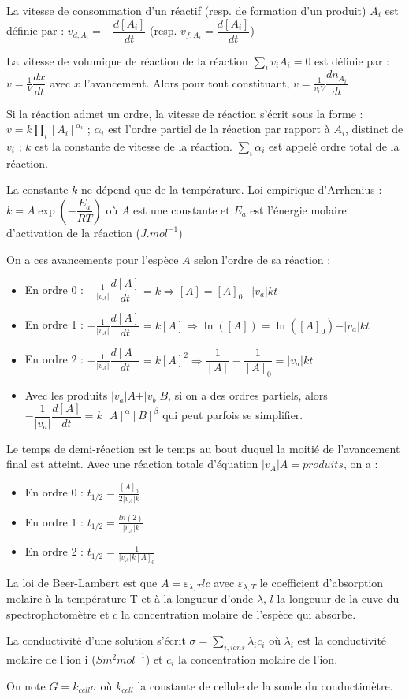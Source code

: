 \documentclass[a4paper,12pt]{book}
\newcommand{\Def}[2]{\begin{tcolorbox}[colback=white,colframe=red!10!green!20!blue!75!, title=Définition : #1]#2\end{tcolorbox}}
\newcommand{\Thr}[2]{\begin{tcolorbox}[sharp corners, colback=white,colframe=red!10!blue!30!green!75!, title=Théorème : #1]#2\end{tcolorbox}}
\newcommand{\Meth}[2]{\begin{tcolorbox}[colback=white,colframe=green!60!green!30!black!75, title=Méthode :  #1]#2\end{tcolorbox}}
\begin{document}
\Def{Vitesses dans une réaction}{La vitesse de consommation d'un réactif (resp. de formation d'un produit) $A_i$ est définie par : $v_{d,A_i} = -\dfrac{d[A_i]}{dt}$ (resp. $v_{f,A_i} = \dfrac{d[A_i]}{dt}$)
\par La vitesse de volumique de réaction de la réaction $\sum\limits_{i} v_iA_i=0$ est définie par : $v=\frac{1}{V}\dfrac{dx}{dt}$ avec $x$ l'avancement. Alors pour tout constituant, $v= \frac{1}{v_i V}\dfrac{dn_{A_i}}{dt}$
\par Si la réaction admet un ordre, la vitesse de réaction s'écrit sous la forme : $v=k\prod\limits_{i}[A_i]^{\alpha_i}$ ; $\alpha_i$ est l'ordre partiel de la réaction par rapport à $A_i$, distinct de $v_i$ ; $k$ est la constante de vitesse de la réaction. $\sum\limits_{i} \alpha_i$ est appelé ordre total de la réaction.
\par La constante $k$ ne dépend que de la température. Loi empirique d'Arrhenius : $k = A\exp(-\dfrac{E_a}{RT})$ où $A$ est une constante et $E_a$ est l'énergie molaire d'activation de la réaction ($J.mol^{-1}$)
}
\Meth{Calculs d'ordre}{On a ces avancements pour l'espèce $A$ selon l'ordre de sa réaction :\begin{itemize}
\item En ordre 0 : $-\frac{1}{\vert v_A\vert}\dfrac{d[A]}{dt}=k\Rightarrow [A]=[A]_0-\vert v_a\vert kt$
\item En ordre 1 : $-\frac{1}{\vert v_A\vert}\dfrac{d[A]}{dt}=k[A]\Rightarrow \ln([A])=\ln([A]_0)-\vert v_a\vert kt$
\item En ordre 2 : $-\frac{1}{\vert v_A\vert}\dfrac{d[A]}{dt}=k[A]^2\Rightarrow \dfrac{1}{[A]}-\dfrac{1}{[A]_0}=\vert v_a\vert kt$
\item Avec les produits $\vert v_a\vert A + \vert v_b\vert B$, si on a des ordres partiels, alors $-\dfrac{1}{\vert v_a\vert}\dfrac{d[A]}{dt}=k[A]^\alpha[B]^\beta$ qui peut parfois se simplifier.
\end{itemize}
}
\Meth{Temps de demi-réaction}{Le temps de demi-réaction est le temps au bout duquel la moitié de l'avancement final est atteint. Avec une réaction totale d'équation $\vert v_A\vert A = produits$, on a :\begin{itemize}
\item En ordre 0 : $t_{1/2} = \frac{[A]_0}{2\vert v_A\vert k}$ 
\item En ordre 1 : $t_{1/2} = \frac{ln(2)}{\vert v_A\vert k}$
\item En ordre 2 : $t_{1/2} = \frac{1}{\vert v_A\vert k[A]_0}$
\end{itemize}
}
\Thr{Beer-Lambert}{La loi de Beer-Lambert est que $A = \varepsilon_{\lambda,T}lc$ avec $\varepsilon_{\lambda,T}$ le coefficient d'absorption molaire à la température T et à la longueur d'onde $\lambda$, $l$ la longeuur de la cuve du spectrophotomètre et $c$ la concentration molaire de l'espèce qui absorbe.
\par La conductivité d'une solution s'écrit $\sigma =\sum\limits_{i, ions}\lambda_i c_i$ où $\lambda_i$ est la conductivité molaire de l'ion i ($Sm^2mol^{-1}$) et $c_i$ la concentration molaire de l'ion.
\par On note $G=k_{cell}\sigma$ où $k_{cell}$ la constante de cellule de la sonde du conductimètre.
}
\end{document}
